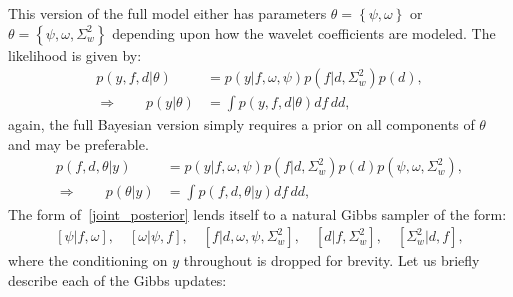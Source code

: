 \documentclass[a4paper,11pt]{article}
\begin{document}
This version of the full model either has parameters $\theta=\left\{\psi,\omega\right\}$ or $\theta=\left\{\psi,\omega,\Sigma^{2}_{w}\right\}$ depending upon how the wavelet coefficients are modeled. The likelihood is given by:
\begin{align}
 p(y,f,d|\theta) &= p(y|f,\omega,\psi)p(f|d,\Sigma^{2}_{w})p(d) , \\
 \Rightarrow{} \qquad p(y|\theta) &= \int{}p(y,f,d|\theta)df\,dd ,
\end{align}
again, the full Bayesian version simply requires a prior on all components of $\theta$ and may be preferable. 
\begin{align}
\label{joint_posterior} 
 p(f,d,\theta|y) &= p(y|f,\omega,\psi)p(f|d,\Sigma^{2}_{w})p(d)p(\psi,\omega,\Sigma^{2}_{w}) ,  \\
 \Rightarrow{} \qquad p(\theta|y) &= \int{}p(f,d,\theta|y)df\,dd ,
\end{align}
The form of~\eqref{joint_posterior} lends itself to a natural Gibbs sampler of the form:
\begin{align*}
 \left[\psi|f,\omega\right] , \quad
 \left[\omega|\psi,f\right] , \quad
 \left[f|d,\omega,\psi,\Sigma^{2}_{w}\right] , \quad
 \left[d|f,\Sigma^{2}_{w}\right] , \quad 
 \left[\Sigma^{2}_{w}|d,f\right] ,
\end{align*}
where the conditioning on $y$ throughout is dropped for brevity. Let us briefly describe each of the Gibbs updates:
\end{document}
